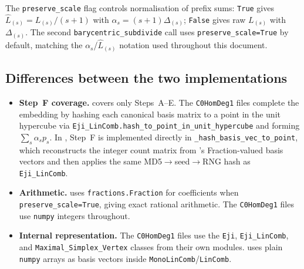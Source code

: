 \noindent
The \texttt{preserve\_scale} flag controls normalisation of prefix sums:
\texttt{True} gives $\hat{L}_{(s)} = L_{(s)}/(s{+}1)$ with
$\alpha_s = (s{+}1)\Delta_{(s)}$; \texttt{False} gives raw $L_{(s)}$ with
$\Delta_{(s)}$.  The second \texttt{barycentric\_subdivide} call uses
\texttt{preserve\_scale=True} by default, matching the $\alpha_s$/$\hat{L}_{(s)}$
notation used throughout this document.

\subsection*{Differences between the two implementations}

\begin{sloppypar}
\begin{itemize}[nosep]
\item \textbf{Step~F coverage.}  \encdecpy{} covers only Steps~A--E.
  The \texttt{C0HomDeg1} files complete the embedding by hashing each canonical
  basis matrix to a point in the unit hypercube via
  \texttt{Eji\_LinComb.}\allowbreak\texttt{hash\_to\_point\_in\_unit\_hypercube}
  and forming $\sum_s \alpha_s p_s$.  In \algtwobpy{}, Step~F is implemented
  directly in \texttt{\_hash\_basis\_vec\_to\_point}, which reconstructs the
  integer count matrix from \encdecpy{}'s Fraction-valued basis vectors and then
  applies the same MD5$\to$seed$\to$RNG hash as \texttt{Eji\_LinComb}.

\item \textbf{Arithmetic.}  \encdecpy{} uses \texttt{fractions.Fraction} for
  coefficients when \texttt{preserve\_scale=True}, giving exact rational
  arithmetic.  The \texttt{C0HomDeg1} files use \texttt{numpy} integers
  throughout.

\item \textbf{Internal representation.}  The \texttt{C0HomDeg1} files use the
  \texttt{Eji}, \texttt{Eji\_LinComb}, and \texttt{Maximal\_Simplex\_Vertex}
  classes from their own modules.  \encdecpy{} uses plain \texttt{numpy} arrays
  as basis vectors inside \texttt{MonoLinComb}/\texttt{LinComb}.
\end{itemize}
\end{sloppypar}
